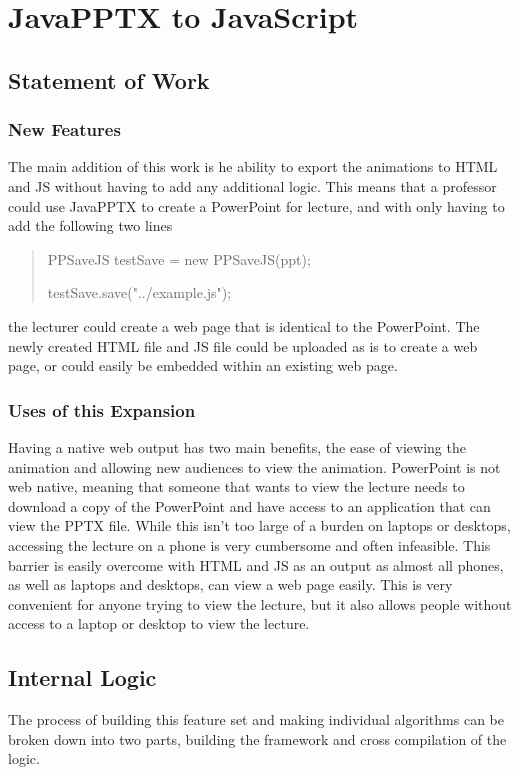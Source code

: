 \documentclass[12pt,twoside]{reedthesis}
\begin{document}
\chapter{JavaPPTX to JavaScript}

\section{Statement of Work}

\subsection{New Features}
The main addition of this work is he ability to export the animations to HTML and JS without having to add any additional logic. This means that a professor could use JavaPPTX to create a PowerPoint for lecture, and with only having to add the following two lines
\begin{quote}
PPSaveJS testSave = new PPSaveJS(ppt);

testSave.save("../example.js");
\end{quote}
the lecturer could create a web page that is identical to the PowerPoint. The newly created HTML file and JS file could be uploaded as is to create a web page, or could easily be embedded within an existing web page. 

\subsection{Uses of this Expansion}
Having a native web output has two main benefits, the ease of viewing the animation and allowing new audiences to view the animation. PowerPoint is not web native, meaning that someone that wants to view the lecture needs to download a copy of the PowerPoint and have access to an application that can view the PPTX file. While this isn't too large of a burden on laptops or desktops, accessing the lecture on a phone is very cumbersome and often infeasible. This barrier is easily overcome with HTML and JS as an output as almost all phones, as well as laptops and desktops, can view a web page easily. This is very convenient for anyone trying to view the lecture, but it also allows people without access to a laptop or desktop to view the lecture. 

\section{Internal Logic}
The process of building this feature set and making individual algorithms can be broken down into two parts, building the framework and cross compilation of the logic. 
\end{document}
